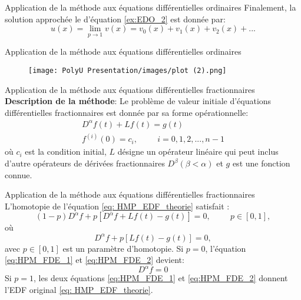 \documentclass{sintefbeamer}
\begin{document}
\begin{frame}{Application de la méthode aux équations différentielles ordinaires}
    Finalement, la solution approchée le d'équation \ref{ex:EDO_2} est donnée par:
\begin{equation}
    u(x)=\lim_{p\to 1} v(x)=v_0(x)+v_1(x)+v_2(x)+...
\end{equation}
\end{frame}


\begin{frame}{Application de la méthode aux équations différentielles ordinaires}
    \begin{figure}[H]
    \centering
    \texttt{[image: PolyU Presentation/images/plot (2).png]}
\end{figure}
\end{frame}





\begin{frame}{Application de la méthode aux équations différentielles fractionnaires}
    \textbf{Description de la méthode}:
     Le problème de valeur initiale d'équations différentielles fractionnaires est donnée par sa forme opérationnelle:
 \begin{align}\label{eq: HMP_EDF_theorie}
     D^{\alpha} f(t) + Lf(t) = g(t)\\
     f^{(i)} (0) = c_i, \hspace{1cm} i=0,1,2, ..., n-1
 \end{align}
 où $c_i$ est la condition initial, $L$ désigne un opérateur linéaire qui peut inclus d'autre opérateurs de dérivées fractionnaires $D^{\beta}(\beta < \alpha)$ et $g$ est une fonction connue.
\end{frame}


\begin{frame}{Application de la méthode aux équations différentielles fractionnaires}
L'homotopie de l'équation \ref{eq: HMP_EDF_theorie} satisfait :
  \begin{equation}\label{eq:HPM_FDE_1}
      (1-p)D^{\alpha} f +p\left[ D^{\alpha}f + Lf(t) -g(t)\right]=0, \hspace{1cm} p\in [0,1],
  \end{equation}
  où
  \begin{equation}\label{eq:HPM_FDE_2}
      D^{\alpha}f+p\left[Lf(t)-g(t)\right]=0,
  \end{equation}
  avec $p\in[0,1]$ est un paramètre d'homotopie. Si $p=0$, l'équation \ref{eq:HPM_FDE_1} et \ref{eq:HPM_FDE_2} devient:
  \begin{equation}
      D^{\alpha} f=0
  \end{equation}
  Si $p=1$, les deux équations \ref{eq:HPM_FDE_1} et \ref{eq:HPM_FDE_2} donnent l'EDF original \ref{eq: HMP_EDF_theorie}.\\
\end{frame}
\end{document}
